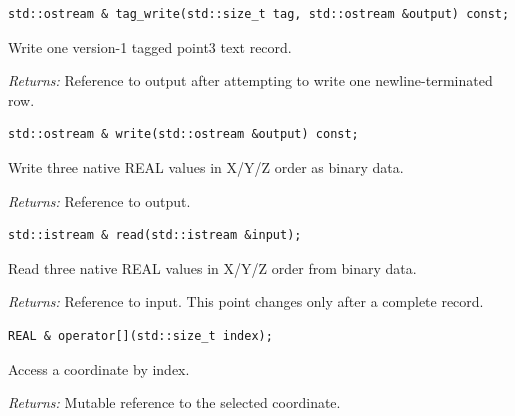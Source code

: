 \par\noindent\begin{minipage}{\linewidth}
\begin{lstlisting}[style=apireference]
std::ostream & tag_write(std::size_t tag, std::ostream &output) const;
\end{lstlisting}
{\footnotesize Write one version-1 tagged point3 text record.\par}
{\footnotesize\textit{Returns:} Reference to output after attempting to write one newline-terminated row.\par}
\end{minipage}\par\vspace{1pt}
\par\noindent\begin{minipage}{\linewidth}
\begin{lstlisting}[style=apireference]
std::ostream & write(std::ostream &output) const;
\end{lstlisting}
{\footnotesize Write three native REAL values in X/Y/Z order as binary data.\par}
{\footnotesize\textit{Returns:} Reference to output.\par}
\end{minipage}\par\vspace{1pt}
\par\noindent\begin{minipage}{\linewidth}
\begin{lstlisting}[style=apireference]
std::istream & read(std::istream &input);
\end{lstlisting}
{\footnotesize Read three native REAL values in X/Y/Z order from binary data.\par}
{\footnotesize\textit{Returns:} Reference to input. This point changes only after a complete record.\par}
\end{minipage}\par\vspace{1pt}
\par\noindent\begin{minipage}{\linewidth}
\begin{lstlisting}[style=apireference]
REAL & operator[](std::size_t index);
\end{lstlisting}
{\footnotesize Access a coordinate by index.\par}
{\footnotesize\textit{Returns:} Mutable reference to the selected coordinate.\par}
\end{minipage}\par\vspace{1pt}
